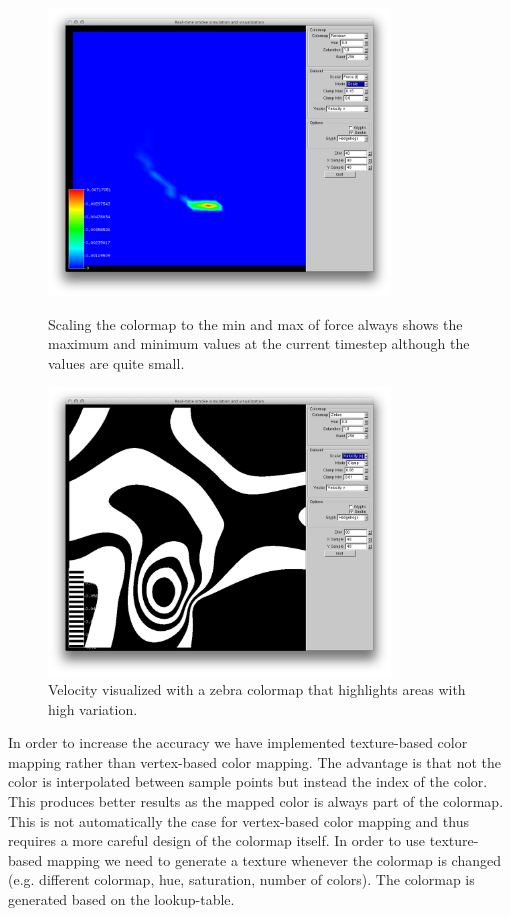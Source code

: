 \begin{figure}[htbp]
\centering
\begin{minipage}[t]{0.48\textwidth}
        \includegraphics[height=3in]{figures/colormaps/forceScaled.png}
\caption{Scaling the colormap to the min and max of force always shows the maximum and minimum values at the current timestep although the values are quite small.}
\label{fig:forceScaled}
\end{minipage}\hspace{.04\textwidth}%
\begin{minipage}[t]{0.48\textwidth}
        \includegraphics[height=3in]{figures/colormaps/velocityZebra.png}
    \caption{Velocity visualized with a zebra colormap that highlights areas with high variation.}
    \label{fig:velocityZebra}
\end{minipage}
\end{figure}

In order to increase the accuracy we have implemented texture-based color mapping rather than vertex-based color mapping. The advantage is that not the color is interpolated between sample points but instead the index of the color. This produces better results as the mapped color is always part of the colormap. This is not automatically the case for vertex-based color mapping and thus requires a more careful design of the colormap itself. In order to use texture-based mapping we need to generate a texture whenever the colormap is changed (e.g. different colormap, hue, saturation, number of colors). 
The colormap is generated based on the lookup-table. 

